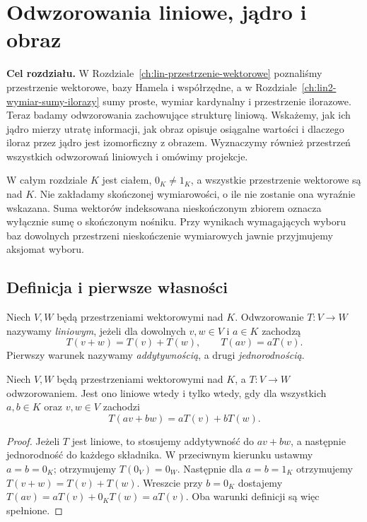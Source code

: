 \chapter{Odwzorowania liniowe, jądro i obraz}
\label{ch:lin3-odwzorowania-liniowe}

\providecommand{\atlasref}[2]{#2}


\noindent\textbf{Cel rozdziału.}
W Rozdziale~\ref{ch:lin-przestrzenie-wektorowe}
poznaliśmy przestrzenie wektorowe, bazy Hamela i współrzędne,
a w Rozdziale~\ref{ch:lin2-wymiar-sumy-ilorazy}
sumy proste, wymiar kardynalny i przestrzenie ilorazowe.
Teraz badamy odwzorowania zachowujące strukturę liniową.
Wskażemy, jak ich jądro mierzy utratę informacji,
jak obraz opisuje osiągalne wartości i dlaczego
iloraz przez jądro jest izomorficzny z obrazem.
Wyznaczymy również przestrzeń wszystkich odwzorowań
liniowych i omówimy projekcje.

W całym rozdziale \(K\) jest ciałem, \(0_K\neq1_K\),
a wszystkie przestrzenie wektorowe są nad \(K\).
Nie zakładamy skończonej wymiarowości, o ile nie
zostanie ona wyraźnie wskazana. Suma wektorów
indeksowana nieskończonym zbiorem oznacza
wyłącznie sumę o skończonym nośniku.
Przy wynikach wymagających wyboru baz dowolnych
przestrzeni nieskończenie wymiarowych
jawnie przyjmujemy aksjomat wyboru.

\section{Definicja i pierwsze własności}
\label{sec:lin3-definicja}

\begin{definicja}
\label{def:lin3-odwzorowanie-liniowe}
Niech \(V,W\) będą przestrzeniami wektorowymi nad \(K\).
Odwzorowanie \(T\colon V\to W\) nazywamy
\emph{liniowym}, jeżeli dla dowolnych \(v,w\in V\)
i \(a\in K\) zachodzą
\[
 T(v+w)=T(v)+T(w),\qquad T(av)=aT(v).
\]
Pierwszy warunek nazywamy \emph{addytywnością},
a drugi \emph{jednorodnością}.
\end{definicja}

\begin{stwierdzenie}
\label{prop:lin3-kryterium}
Niech \(V,W\) będą przestrzeniami wektorowymi
nad \(K\), a \(T\colon V\to W\) odwzorowaniem.
Jest ono liniowe wtedy i tylko wtedy, gdy
dla wszystkich \(a,b\in K\) oraz \(v,w\in V\) zachodzi
\[
 T(av+bw)=aT(v)+bT(w).
\]
\end{stwierdzenie}
\begin{proof}
Jeżeli \(T\) jest liniowe, to stosujemy
addytywność do \(av+bw\), a następnie jednorodność
do każdego składnika. W przeciwnym kierunku
ustawmy \(a=b=0_K\); otrzymujemy \(T(0_V)=0_W\).
Następnie dla \(a=b=1_K\) otrzymujemy
\(T(v+w)=T(v)+T(w)\).
Wreszcie przy \(b=0_K\) dostajemy
\(T(av)=aT(v)+0_KT(w)=aT(v)\).
Oba warunki definicji są więc spełnione.
\end{proof}

